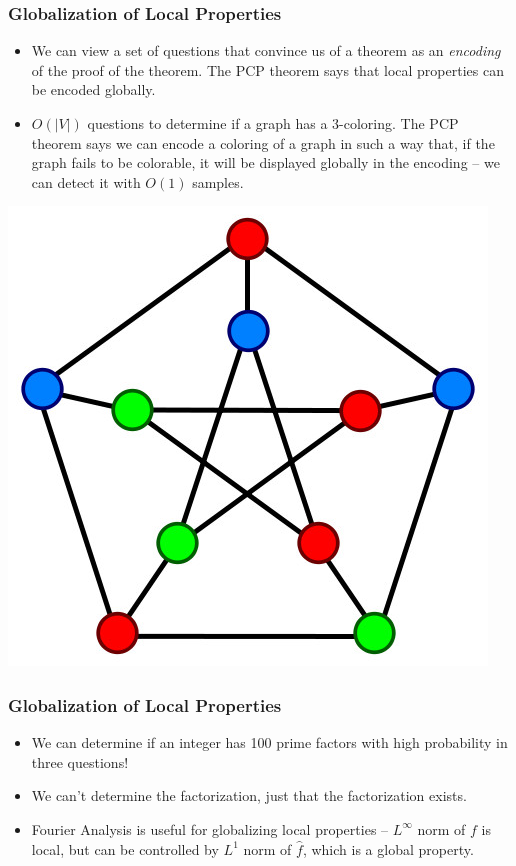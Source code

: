 \documentclass{beamer}
\begin{document}
\begin{frame}
    \frametitle{Globalization of Local Properties}
    \begin{itemize}
        \item We can view a set of questions that convince us of a theorem as an {\it encoding} of the proof of the theorem. The PCP theorem says that local properties can be encoded globally.

        \item $O(|V|)$ questions to determine if a graph has a 3-coloring. The PCP theorem says we can encode a coloring of a graph in such a way that, if the graph fails to be colorable, it will be displayed globally in the encoding -- we can detect it with $O(1)$ samples.
    \end{itemize}
    \begin{center}
        \includegraphics[scale=0.25]{3coloring.jpg}
    \end{center}
\end{frame}

\begin{frame}
    \frametitle{Globalization of Local Properties}

    \begin{itemize}
        \item We can determine if an integer has 100 prime factors with high probability in three questions!

        \item We can't determine the factorization, just that the factorization exists.

        \item Fourier Analysis is useful for globalizing local properties -- $L^\infty$ norm of $f$ is local, but can be controlled by $L^1$ norm of $\hat{f}$, which is a global property.
    \end{itemize}
\end{frame}
\end{document}
